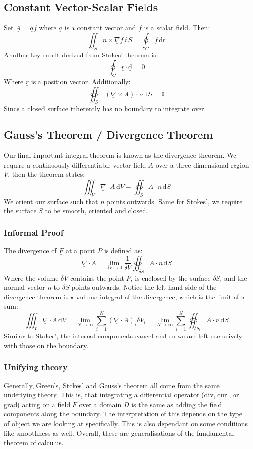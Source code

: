 \documentclass[12pt]{article}
\newcommand{\dive}[1]{\underline{\nabla}\cdot\underline{#1}}
\newcommand{\grad}[1]{\underline{\nabla}#1}
\newcommand{\curl}[1]{\underline{\nabla}\times \underline{#1}}
\begin{document}
\subsection{Constant Vector-Scalar Fields}
Set \(\underline{A}=\underline{a}f\) where \(\underline{a}\) is a constant vector and \(f\) is a scalar field. Then:
\[\iint_S\underline{n}\times \grad{f}\,\text{d}S=\oint_Cf\,\underline{\text{d}r}\]
Another key result derived from Stokes' theorem is:
\[\oint_C\underline{r}\cdot\underline{\text{d}}=0\]
Where \(\underline{r}\) is a position vector. Additionally:
\[\oiint_S\,(\curl{A})\cdot \underline{n}\,\text{d}S=0\]
Since a closed surface inherently has no boundary to integrate over.
\subsection{Gauss's Theorem / Divergence Theorem}
Our final important integral theorem is known as the divergence theorem. We require a continuously differentiable vector field \(\underline{A}\) over a three dimensional region \(V\), then the theorem states:
\[\iiint_V\dive{A}\,\text{d}V=\oiint_S\underline{A}\cdot\underline{n}\,\text{d}S\]
We orient our surface such that \(\underline{n}\) points outwards. Same for Stokes', we require the surface \(S\) to be smooth, oriented and closed.
\subsubsection{Informal Proof}
The divergence of \(\underline{F}\) at a point \(P\) is defined as:
\[\dive{A}=\lim_{\delta V\to 0}\frac{1}{\delta V}\oiint_{\delta S}\underline{A}\cdot\underline{n}\,\text{d}S \]
Where the volume \(\delta V\) contains the point \(P\), is enclosed by the surface \(\delta S\), and the normal vector \(\underline{n}\) to \(\delta S\) points outwards. Notice the left hand side of the divergence theorem is a volume integral of the divergence, which is the limit of a sum:
\[\iiint_V \dive{A}\,\text{d}V=\lim_{N\to\infty}\sum^N_{i=1}(\dive{A})_i\delta V_i=\lim_{N\to\infty}\sum^N_{i=1}\oiint_{\delta S_i}\underline{A}\cdot\underline{n}\,\text{d}S\]
Similar to Stokes', the internal components cancel and so we are left exclusively with those on the boundary. 
\subsubsection{Unifying theory}
Generally, Green's, Stokes' and Gauss's theorem all come from the same underlying theory. This is, that integrating a differential operator (div, curl, or grad) acting on a field \(\underline{F}\) over a domain \(D\) is the same as adding the field components along the boundary. The interpretation of this depends on the type of object we are looking at specifically. This is also dependant on some conditions like smoothness as well. Overall, these are generalisations of the fundamental theorem of calculus.
\clearpage
\end{document}
